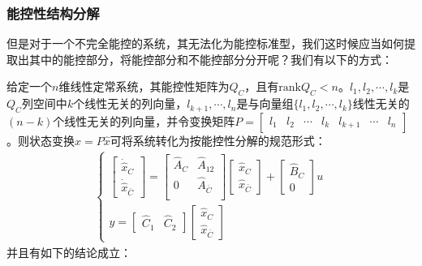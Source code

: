 \subsubsection{能控性结构分解}

但是对于一个不完全能控的系统，其无法化为能控标准型，我们这时候应当如何提取出其中的能控部分，将能控部分和不能控部分分开呢？我们有以下的方式：

\begin{anymark}[能控性结构分解]
    给定一个$n$维线性定常系统，其能控性矩阵为$Q_C$，且有$\text{rank} Q_C < n$。$l_1 , l_2 , \cdots ,l_k$是$Q_C$列空间中$k$个线性无关的列向量，$l_{k+1},\cdots,l_n$是与向量组$\{l_1,l_2,\cdots,l_k\}$线性无关的$(n-k)$个线性无关的列向量，并令变换矩阵$P = \begin{bmatrix}
        l_1 & l_2 & \cdots & l_k & l_{k+1} & \cdots & l_n 
    \end{bmatrix}$。则状态变换$x = P \hat{x}$可将系统转化为按能控性分解的规范形式：
    \begin{gather*}
        \begin{cases}
            \begin{bmatrix}
                \dot{\hat{x}}_C \\ \dot{\hat{x}}_{\bar{C}}
            \end{bmatrix} = \begin{bmatrix}
                \hat{A}_C & \hat{A}_{12} \\
                0         & \hat{A}_{\bar{C}}\\
            \end{bmatrix} \begin{bmatrix}
                \hat{x}_C \\ \hat{x}_{\bar{C}}
            \end{bmatrix} + \begin{bmatrix}
                \hat{B}_C \\ 0
            \end{bmatrix} u \\
            y = \begin{bmatrix}
                \hat{C}_1 & \hat{C}_2
            \end{bmatrix} \begin{bmatrix}
                \hat{x}_C  \\  \hat{x}_{\bar{C}}
            \end{bmatrix}
        \end{cases}
    \end{gather*}
    并且有如下的结论成立：

\end{anymark}
